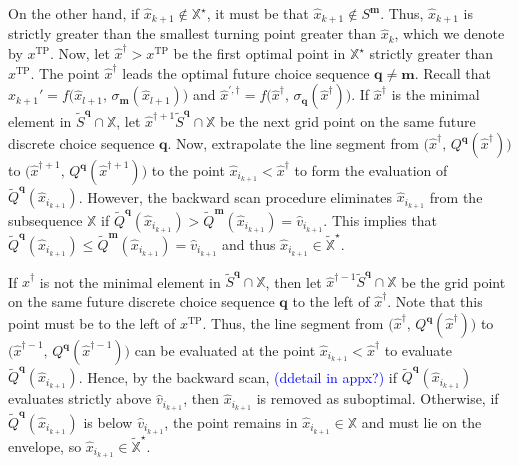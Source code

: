 \documentclass[12pt]{article}
\newcommand{\mVecVar}{\mathbf{m}}
\newcommand{\qVecVar}{\mathbf{q}}
\begin{document}

On the other hand, if $\hat{x}_{k+1}\not \in \mathbb{X}^{\star}$, it must be that $\hat{x}_{k+1}\not \in S^{\mVecVar}$.  Thus, $\hat{x}_{k+1}$ is strictly greater than the smallest turning point greater than $\hat{x}_{k}$, which we denote by $x^{\text{TP}}$. Now, let $\hat{x}^{\dagger}> x^{\text{TP}}$ be the first optimal point in $\mathbb{X}^{\star}$ strictly greater than $x^{\text{TP}}$. The point $\hat{x}^{\dagger}$ leads the  optimal future choice sequence $\qVecVar \neq \mVecVar$.  
Recall that $\hat{x}_{k+1}' = f\!\bigl(\hat{x}_{l+1},\,\sigma_{\mVecVar}(\hat{x}_{l+1})\bigr)$ and $\hat{x}^{\prime,\dagger} =  f\!\bigl(\hat{x}^{\dagger},\,\sigma_{\qVecVar}(\hat{x}^{\dagger})\bigr)$.
%
%
If $\hat{x}^{\dagger}$ is the minimal element in $\widetilde{S}^{\qVecVar}\cap \mathbb{X}$, let $\hat{x}^{\dagger +1}\widetilde{S}^{\qVecVar}\cap \mathbb{X}$ be the next grid point on the same future discrete choice sequence $\qVecVar$. Now, extrapolate the line segment from $\bigl(\hat{x}^{\dagger},\,Q^{\qVecVar}(\hat{x}^{\dagger})\bigr)$ to $\bigl(\hat{x}^{\dagger+1},\,Q^{\qVecVar}(\hat{x}^{\dagger+1})\bigr)$ 
to the point $\hat{x}_{i_{k+1}}< \hat{x}^{\dagger}$ to form the evaluation of $\widetilde{Q}^{\qVecVar}(\hat{x}_{i_{k+1}})$. However, the backward scan procedure eliminates $\hat{x}_{i_{k+1}}$ from the subsequence $\mathbb{X}$ if $\widetilde{Q}^{\qVecVar}(\hat{x}_{i_{k+1}})> \widetilde{Q}^{\mVecVar}(\hat{x}_{i_{k+1}}) = \hat{v}_{i_{k+1}}$. This implies that $\widetilde{Q}^{\qVecVar}(\hat{x}_{i_{k+1}})\leq  \widetilde{Q}^{\mVecVar}(\hat{x}_{i_{k+1}}) = \hat{v}_{i_{k+1}}$ and thus $\hat{x}_{i_{k+1}}\in \widetilde{\mathbb{X}}^{\star}$. 


If $\hat{x}^{\dagger}$ is not the minimal element in $\widetilde{S}^{\qVecVar}\cap \mathbb{X}$, then let $\hat{x}^{\dagger -1}\widetilde{S}^{\qVecVar}\cap \mathbb{X}$ be the grid point on the same future discrete choice sequence $\qVecVar$ to the left of $\hat{x}^{\dagger}$. Note that this point must be to the left of $x^{\text{TP}}$. Thus, the line segment from $\bigl(\hat{x}^{\dagger},\,Q^{\qVecVar}(\hat{x}^{\dagger})\bigr)$ to $\bigl(\hat{x}^{\dagger-1},\,Q^{\qVecVar}(\hat{x}^{\dagger-1})\bigr)$ can be evaluated at the point $\hat{x}_{i_{k+1}}< \hat{x}^{\dagger}$ to  evaluate $\widetilde{Q}^{\qVecVar}(\hat{x}_{i_{k+1}})$. Hence, by the backward scan, \textcolor{blue}{(ddetail in appx?)} if  $\widetilde{Q}^{\qVecVar}(\hat{x}_{i_{k+1}})$ evaluates strictly above $\hat{v}_{i_{k+1}}$, then $\hat{x}_{i_{k+1}}$ is removed as suboptimal.  Otherwise, if $\widetilde{Q}^{\qVecVar}(\hat{x}_{i_{k+1}})$ is below $\hat{v}_{i_{k+1}}$, the point remains in $\hat{x}_{i_{k+1}}\in \mathbb{X}$ and must lie on the envelope, so $\hat{x}_{i_{k+1}} \in \widetilde{\mathbb{X}}^{\star}$.
\end{document}

